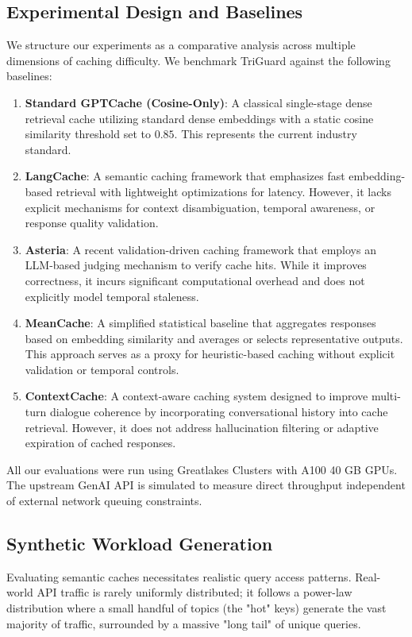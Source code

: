 \documentclass[sigconf]{acmart}
\begin{document}
\subsection{Experimental Design and Baselines}

We structure our experiments as a comparative analysis across multiple dimensions of caching difficulty. We benchmark TriGuard against the following baselines:

\begin{enumerate}
    \item \textbf{Standard GPTCache (Cosine-Only)}: A classical single-stage dense retrieval cache utilizing standard dense embeddings with a static cosine similarity threshold set to $0.85$. This represents the current industry standard.

    \item \textbf{LangCache}: A semantic caching framework that emphasizes fast embedding-based retrieval with lightweight optimizations for latency. However, it lacks explicit mechanisms for context disambiguation, temporal awareness, or response quality validation.

    \item \textbf{Asteria}: A recent validation-driven caching framework that employs an LLM-based judging mechanism to verify cache hits. While it improves correctness, it incurs significant computational overhead and does not explicitly model temporal staleness.

    \item \textbf{MeanCache}: A simplified statistical baseline that aggregates responses based on embedding similarity and averages or selects representative outputs. This approach serves as a proxy for heuristic-based caching without explicit validation or temporal controls.

    \item \textbf{ContextCache}: A context-aware caching system designed to improve multi-turn dialogue coherence by incorporating conversational history into cache retrieval. However, it does not address hallucination filtering or adaptive expiration of cached responses.
\end{enumerate}

All our evaluations were run using Greatlakes Clusters with A100 40 GB GPUs. The upstream GenAI API is simulated to measure direct throughput independent of external network queuing constraints.

\subsection{Synthetic Workload Generation}
Evaluating semantic caches necessitates realistic query access patterns. Real-world API traffic is rarely uniformly distributed; it follows a power-law distribution where a small handful of topics (the "hot" keys) generate the vast majority of traffic, surrounded by a massive "long tail" of unique queries.
\end{document}

